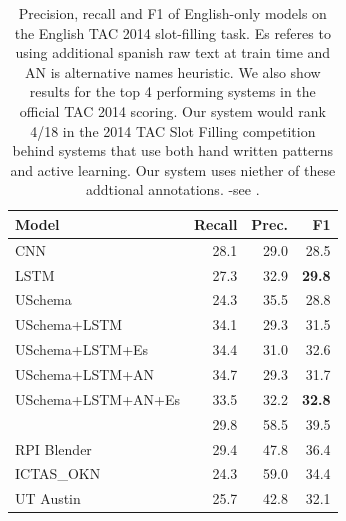 \begin{table}[tb]
\begin{center}
\begin{tabular}{|lrrr|}
\hline
\bf Model & \bf Recall & \bf Prec. & \bf F1 \\
\hline\hline
CNN                 & 28.1 & 29.0 & 28.5 \\
LSTM                & 27.3 & 32.9 & \bf 29.8  \\
USchema             & 24.3 & 35.5 & 28.8 \\
\hline\hline
USchema+LSTM        & 34.1 & 29.3 & 31.5 \\
USchema+LSTM+Es        & 34.4 & 31.0 & 32.6 \\
USchema+LSTM+AN        & 34.7 & 29.3 & 31.7 \\
USchema+LSTM+AN+Es        & 33.5 & 32.2 & \bf 32.8 \\
\hline\hline
\citet{angeli2014stanford} & 29.8 & 58.5 & 39.5 \\
RPI Blender & 29.4 & 47.8 & 36.4 \\
ICTAS\_OKN & 24.3 & 59.0 & 34.4 \\
UT Austin & 25.7 & 42.8 & 32.1 \\
\hline
\end{tabular}
\caption{Precision, recall and F1 of English-only models on the English TAC 2014 slot-filling task. Es referes to using additional spanish raw text at train time and AN is alternative names heuristic. We also show results for the top 4 performing systems in the official TAC 2014 scoring. Our system would rank 4/18 in the 2014 TAC Slot Filling competition behind systems that use both hand written patterns and active learning. Our system uses niether of these addtional annotations. -see  \protect\cite{SurdeanuMihai2014}. \label{2014-en-tac-table}}
\end{center}
\end{table}





